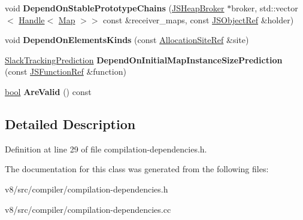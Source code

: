\begin{DoxyCompactItemize}
void {\bfseries Depend\+On\+Stable\+Prototype\+Chains} (\mbox{\hyperlink{classv8_1_1internal_1_1compiler_1_1JSHeapBroker}{J\+S\+Heap\+Broker}} $\ast$broker, std\+::vector$<$ \mbox{\hyperlink{classv8_1_1internal_1_1Handle}{Handle}}$<$ \mbox{\hyperlink{classv8_1_1internal_1_1Map}{Map}} $>$$>$ const \&receiver\+\_\+maps, const \mbox{\hyperlink{classv8_1_1internal_1_1compiler_1_1JSObjectRef}{J\+S\+Object\+Ref}} \&holder)
\item 
\mbox{\label{classv8_1_1internal_1_1compiler_1_1CompilationDependencies_a286b6c4b45386314e604356997511d28}} 
void {\bfseries Depend\+On\+Elements\+Kinds} (const \mbox{\hyperlink{classv8_1_1internal_1_1compiler_1_1AllocationSiteRef}{Allocation\+Site\+Ref}} \&site)
\item 
\mbox{\label{classv8_1_1internal_1_1compiler_1_1CompilationDependencies_aed821e982346989c9ef9e049bdc9fc4a}} 
\mbox{\hyperlink{classv8_1_1internal_1_1compiler_1_1SlackTrackingPrediction}{Slack\+Tracking\+Prediction}} {\bfseries Depend\+On\+Initial\+Map\+Instance\+Size\+Prediction} (const \mbox{\hyperlink{classv8_1_1internal_1_1compiler_1_1JSFunctionRef}{J\+S\+Function\+Ref}} \&function)
\item 
\mbox{\label{classv8_1_1internal_1_1compiler_1_1CompilationDependencies_ad185f184c34a2d960b13cf4f066f35b8}} 
\mbox{\hyperlink{classbool}{bool}} {\bfseries Are\+Valid} () const
\end{DoxyCompactItemize}


\subsection{Detailed Description}


Definition at line 29 of file compilation-\/dependencies.\+h.



The documentation for this class was generated from the following files\+:\begin{DoxyCompactItemize}
\item 
v8/src/compiler/compilation-\/dependencies.\+h\item 
v8/src/compiler/compilation-\/dependencies.\+cc\end{DoxyCompactItemize}
